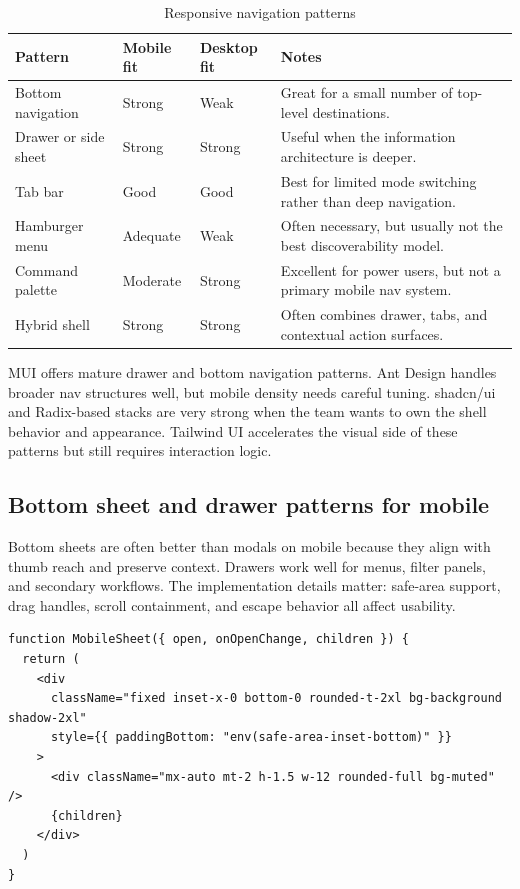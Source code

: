 \begin{table}[htbp]
  \centering
  \caption{Responsive navigation patterns}
  \begin{tabularx}{\textwidth}{@{}p{}p{}p{}Y@{}}
    \toprule
    \textbf{Pattern} & \textbf{Mobile fit} & \textbf{Desktop fit} & \textbf{Notes} \\
    \midrule
    Bottom navigation & Strong & Weak & Great for a small number of top-level destinations. \\
    Drawer or side sheet & Strong & Strong & Useful when the information architecture is deeper. \\
    Tab bar & Good & Good & Best for limited mode switching rather than deep navigation. \\
    Hamburger menu & Adequate & Weak & Often necessary, but usually not the best discoverability model. \\
    Command palette & Moderate & Strong & Excellent for power users, but not a primary mobile nav system. \\
    Hybrid shell & Strong & Strong & Often combines drawer, tabs, and contextual action surfaces. \\
    \bottomrule
  \end{tabularx}
\end{table}

MUI offers mature drawer and bottom navigation patterns. Ant Design handles broader nav structures well, but mobile density needs careful tuning. shadcn/ui and Radix-based stacks are very strong when the team wants to own the shell behavior and appearance. Tailwind UI accelerates the visual side of these patterns but still requires interaction logic.

\subsection{Bottom sheet and drawer patterns for mobile}
Bottom sheets are often better than modals on mobile because they align with thumb reach and preserve context. Drawers work well for menus, filter panels, and secondary workflows. The implementation details matter: safe-area support, drag handles, scroll containment, and escape behavior all affect usability.

\begin{verbatim}
function MobileSheet({ open, onOpenChange, children }) {
  return (
    <div
      className="fixed inset-x-0 bottom-0 rounded-t-2xl bg-background shadow-2xl"
      style={{ paddingBottom: "env(safe-area-inset-bottom)" }}
    >
      <div className="mx-auto mt-2 h-1.5 w-12 rounded-full bg-muted" />
      {children}
    </div>
  )
}
\end{verbatim}

